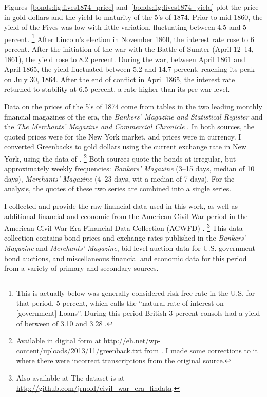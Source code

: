 Figures~\ref{bonds:fig:fives1874_price} and~\ref{bonds:fig:fives1874_yield} plot the price in gold dollars and the yield to maturity of the 5's of 1874.
Prior to mid-1860, the yield of the Fives was low with little variation, fluctuating between 4.5 and 5 percent.%
\footnote{
  This is actually below was generally considered risk-free rate in the U.S. for that period, 5 percent, which \textcite[29]{Elder1863} calls the ``natural rate of interest on [government] Loans''.
  During this period British 3 percent consols had a yield of between of 3.10 and 3.28 \parencite[193]{HomerSylla2005}.
}
After Lincoln's election in November 1860,  the interest rate rose to 6 percent.
After the initiation of the war with the Battle of Sumter (April 12--14, 1861), the yield rose to 8.2 percent.
During the war, between April 1861 and April 1865, the yield fluctuated between 5.2 and 14.7 percent, reaching its peak on July 30, 1864.
After the end of conflict in April 1865, the interest rate returned to stability at 6.5 percent, a rate higher than its pre-war level.

Data on the prices of the 5's of 1874 come from tables in the two leading monthly financial magazines of the era, the \textit{Bankers' Magazine and Statistical Register} and the \textit{The Merchants' Magazine and Commercial Chronicle} \parencites[186]{Mitchell1903}.
In both sources, the quoted prices were for the New York market, and prices were in currency.
I converted Greenbacks to gold dollars using the current exchange rate in New York, using the data of \textcite{Mitchell1908}.%
\footnote{
  Available in digital form at \url{http://eh.net/wp-content/uploads/2013/11/greenback.txt} from \textcite{WillardGuinnaneEtAl1996}.
  I made some corrections to it where there were incorrect transcriptions from the original source.
}
Both sources quote the bonds at irregular, but approximately weekly frequencies: \textit{Bankers' Magazine} (3--15 days, median of 10 days), \textit{Merchants' Magazine} (4--23 days, wit a median of 7 days).
For the analysis, the quotes of these two series are combined into a single series.

I collected and provide the raw financial data used in this work, as well as additional financial and economic from the American Civil War period in the American Civil War Era Financial Data Collection (ACWFD) \parencite{Arnold2015a}.%
\footnote{Also available at The dataset is at \url{http://github.com/jrnold/civil_war_era_findata}.}
This data collection contains bond prices and exchange rates published in the \textit{Bankers' Magazine} and \textit{Merchants' Magazine}, bid-level auction data for U.S. government bond auctions, and miscellaneous financial and economic data for this period from a variety of primary and secondary sources.

